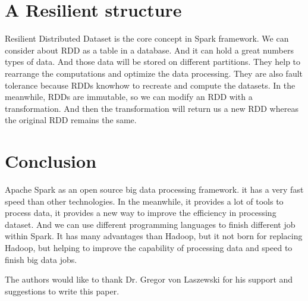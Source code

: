 \documentclass[sigconf]{acmart}
\begin{document}
\section{A Resilient structure}
Resilient Distributed Dataset is the core concept in Spark framework. We can consider about RDD as a table in a database. And it can hold a great numbers types of data. And those data will be stored on different partitions. They help to rearrange the computations and optimize the data processing. They are also fault tolerance because RDDs knowhow to recreate and compute the datasets. In the meanwhile, RDDs are immutable, so we can modify an RDD with a transformation. And then the transformation will return us a new RDD whereas the original RDD remains the same.

\section{Conclusion}
Apache Spark as an open source big data processing framework. it has a very fast speed than other technologies. In the meanwhile, it provides a lot of tools to process data, it provides a new way to improve the efficiency in processing dataset. And we can use different programming languages to finish different job within Spark. It has many advantages than Hadoop, but it not born for replacing Hadoop, but helping to improve the capability of processing data and speed to finish big data jobs.


\begin{acks}

  The authors would like to thank Dr. Gregor von Laszewski for his
  support and suggestions to write this paper.

\end{acks}


 

\appendix
\end{document}
